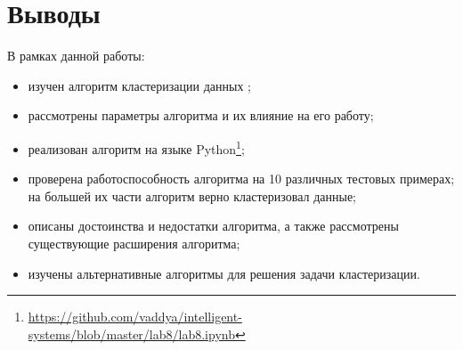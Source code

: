 \section{Выводы}

В рамках данной работы:

\begin{itemize}
	\item изучен алгоритм кластеризации данных ; \item рассмотрены параметры алгоритма и их влияние на его работу;
	\item реализован алгоритм  на языке Python\footnote{\url{https://github.com/vaddya/intelligent-systems/blob/master/lab8/lab8.ipynb}};
	\item проверена работоспособность алгоритма на 10 различных тестовых примерах; на большей их части алгоритм верно кластеризовал данные;
	\item описаны достоинства и недостатки алгоритма, а также рассмотрены существующие расширения алгоритма;
	\item изучены альтернативные алгоритмы для решения задачи кластеризации.
\end{itemize}

\newpage






